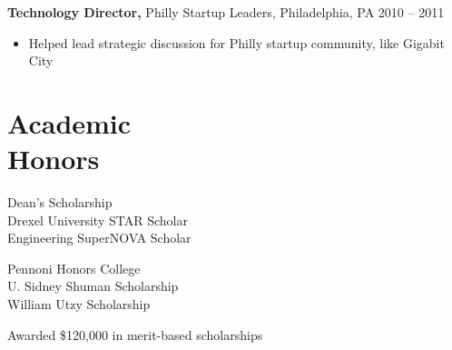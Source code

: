\documentclass[margin]{res}
\begin{document}
\begin{resume}
	{\bf  Technology Director,}  Philly Startup Leaders, Philadelphia, PA \hfill 2010 -- 2011 
	\begin{itemize} \itemsep -2pt
	\item Helped lead strategic discussion for Philly startup community, like Gigabit City
	\end{itemize}


\section{Academic \\ Honors}
\begin{minipage}[t]{0.5\linewidth}
Dean's Scholarship \\
Drexel University STAR Scholar \\
Engineering SuperNOVA Scholar \\
\end{minipage}
\begin{minipage}[t]{0.5\linewidth}
Pennoni Honors College \\
U. Sidney Shuman Scholarship \\
William Utzy Scholarship \\
\end{minipage}

\vspace{-5mm}
{\centering Awarded \$120,000 in merit-based scholarships

}


\end{resume}
\end{document}
